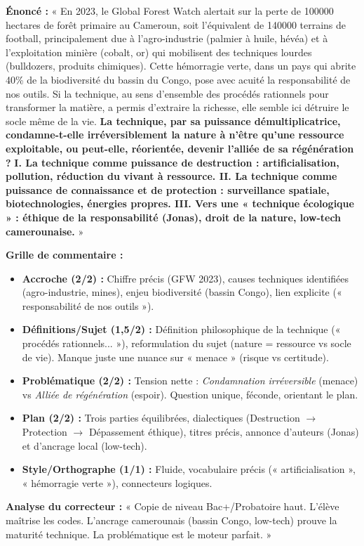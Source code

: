 \documentclass[11pt]{article}
\begin{document}
\begin{exoresolu}
\textbf{Énoncé :} 
« En 2023, le Global Forest Watch alertait sur la perte de \num{100 000} hectares de forêt primaire au Cameroun, soit l'équivalent de \num{140 000} terrains de football, principalement due à l'agro-industrie (palmier à huile, hévéa) et à l'exploitation minière (cobalt, or) qui mobilisent des techniques lourdes (bulldozers, produits chimiques). Cette hémorragie verte, dans un pays qui abrite \num{40}\% de la biodiversité du bassin du Congo, pose avec acuité la responsabilité de nos outils. Si la technique, au sens d'ensemble des procédés rationnels pour transformer la matière, a permis d'extraire la richesse, elle semble ici détruire le socle même de la vie. \textbf{La technique, par sa puissance démultiplicatrice, condamne-t-elle irréversiblement la nature à n'être qu'une ressource exploitable, ou peut-elle, réorientée, devenir l'alliée de sa régénération ?} \textbf{I. La technique comme puissance de destruction : artificialisation, pollution, réduction du vivant à ressource. II. La technique comme puissance de connaissance et de protection : surveillance spatiale, biotechnologies, énergies propres. III. Vers une « technique écologique » : éthique de la responsabilité (Jonas), droit de la nature, low-tech camerounaise.} »

\textbf{Grille de commentaire :}
\begin{itemize}
    \item \textbf{Accroche (2/2) :} Chiffre précis (GFW 2023), causes techniques identifiées (agro-industrie, mines), enjeu biodiversité (bassin Congo), lien explicite (« responsabilité de nos outils »).
    \item \textbf{Définitions/Sujet (1,5/2) :} Définition philosophique de la technique (« procédés rationnels... »), reformulation du sujet (nature = ressource vs socle de vie). Manque juste une nuance sur « menace » (risque vs certitude).
    \item \textbf{Problématique (2/2) :} Tension nette : \textit{Condamnation irréversible} (menace) vs \textit{Alliée de régénération} (espoir). Question unique, féconde, orientant le plan.
    \item \textbf{Plan (2/2) :} Trois parties équilibrées, dialectiques (Destruction $\to$ Protection $\to$ Dépassement éthique), titres précis, annonce d'auteurs (Jonas) et d'ancrage local (low-tech).
    \item \textbf{Style/Orthographe (1/1) :} Fluide, vocabulaire précis (« artificialisation », « hémorragie verte »), connecteurs logiques.
\end{itemize}
\tcblower
\textbf{Analyse du correcteur :} « Copie de niveau Bac+/Probatoire haut. L'élève maîtrise les codes. L'ancrage camerounais (bassin Congo, low-tech) prouve la maturité technique. La problématique est le moteur parfait. »
\end{exoresolu}
\end{document}
